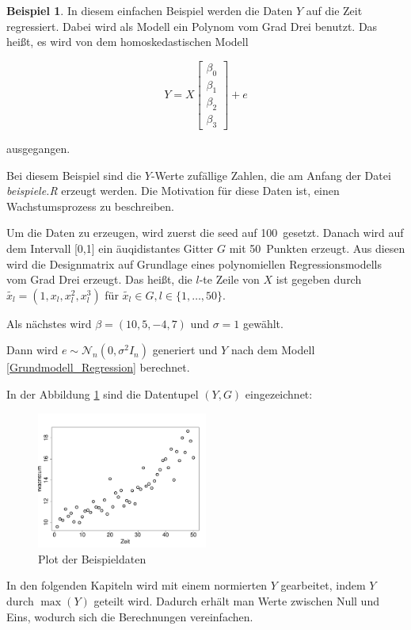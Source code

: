 \documentclass[12pt,a4paper]{article}
\theoremstyle{definition}
\newtheorem{Beispiel}[Definition]{Beispiel}
\theoremstyle{definition}
\theoremstyle{definition}
\theoremstyle{definition}
\newcommand{\seedexample}{100}
\newcommand{\nobs}{50}
\newcommand{\betatrue}{(10,5,-4,7)}
\newcommand{\sigmatrue}{1}
\newcommand{\betaone}[0]{\left[ \begin{array}{c} \beta_{0} \\ \beta_{1} \\ \beta_{2} \\ \beta_{3} \end{array} \right]}
\begin{document}
\begin{Beispiel}
In diesem einfachen Beispiel werden die Daten $Y$ auf die Zeit regressiert. Dabei wird als Modell ein Polynom vom Grad Drei benutzt. Das heißt, es wird von dem homoskedastischen Modell

\begin{equation*}
Y =  X  \betaone + e 
\end{equation*}

ausgegangen.

Bei diesem Beispiel sind die $Y$-Werte zufällige Zahlen, die am Anfang der Datei \textit{beispiele.R} erzeugt werden. Die Motivation für diese Daten ist, einen Wachstumsprozess zu beschreiben.

Um die Daten zu erzeugen, wird zuerst die seed auf \seedexample  ~gesetzt. Danach wird  auf dem Intervall [0,1] ein äuqidistantes Gitter $G$ mit \nobs ~Punkten erzeugt. Aus diesen wird die Designmatrix auf Grundlage eines polynomiellen Regressionsmodells vom Grad Drei erzeugt. Das heißt, die $l$-te Zeile von $X$ ist gegeben durch $\tilde{x_l} = (1, x_l, x_l^2, x_l^3)$ für $\tilde{x_l} \in G, l \in \{1, \ldots, \nobs\}$.

Als nächstes wird $\beta = \betatrue$ und $\sigma = \sigmatrue$ gewählt. 

Dann wird $e \sim \mathscr{N}_{n}(0,\sigma^2 I_n)$ generiert und  $Y$ nach dem Modell \eqref{Grundmodell_Regression} berechnet.

In der Abbildung \ref{Beispieldaten} sind die Datentupel $(Y,G)$ eingezeichnet:

\begin{figure}[H] 
  \centering
     \includegraphics[width=0.5\textwidth]{data-raw-R}
  \caption{Plot der Beispieldaten}
  \label{Beispieldaten}
\end{figure}

In den folgenden Kapiteln wird mit einem normierten $Y$ gearbeitet, indem $Y$ durch $\max(Y)$ geteilt wird. Dadurch erhält man Werte zwischen Null und Eins, wodurch sich die Berechnungen vereinfachen.


\end{Beispiel}
\end{document}
